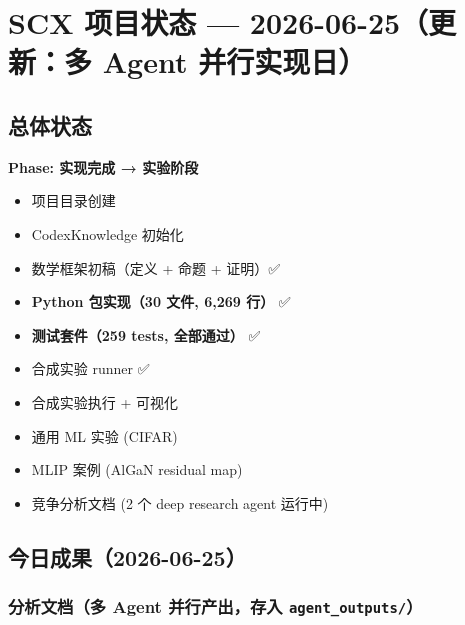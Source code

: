 \documentclass[
  12pt,
]{ctexart}
\author{SCX}
\date{2026}
\providecommand{\tightlist}{%
  \setlength{\itemsep}{0pt}\setlength{\parskip}{0pt}}
\begin{document}
\section{SCX 项目状态 --- 2026-06-25（更新：多 Agent
并行实现日）}\label{scx-ux9879ux76eeux72b6ux6001-2026-06-25ux66f4ux65b0ux591a-agent-ux5e76ux884cux5b9eux73b0ux65e5}

\subsection{总体状态}\label{ux603bux4f53ux72b6ux6001}

\textbf{Phase: 实现完成 → 实验阶段}

\begin{itemize}
\tightlist
\item[$\boxtimes$]
  项目目录创建
\item[$\boxtimes$]
  CodexKnowledge 初始化
\item[$\boxtimes$]
  数学框架初稿（定义 + 命题 + 证明）✅
\item[$\boxtimes$]
  \textbf{Python 包实现（30 文件, 6,269 行）} ✅
\item[$\boxtimes$]
  \textbf{测试套件（259 tests, 全部通过）} ✅
\item[$\boxtimes$]
  合成实验 runner ✅
\item[$\square$]
  合成实验执行 + 可视化
\item[$\square$]
  通用 ML 实验 (CIFAR)
\item[$\square$]
  MLIP 案例 (AlGaN residual map)
\item[$\square$]
  竞争分析文档 (2 个 deep research agent 运行中)
\end{itemize}

\subsection{今日成果（2026-06-25）}\label{ux4ecaux65e5ux6210ux679c2026-06-25}

\subsubsection{\texorpdfstring{分析文档（多 Agent 并行产出，存入
\texttt{agent\_outputs/}）}{分析文档（多 Agent 并行产出，存入 agent\_outputs/）}}\label{ux5206ux6790ux6587ux6863ux591a-agent-ux5e76ux884cux4ea7ux51faux5b58ux5165-agent_outputs}
\end{document}
